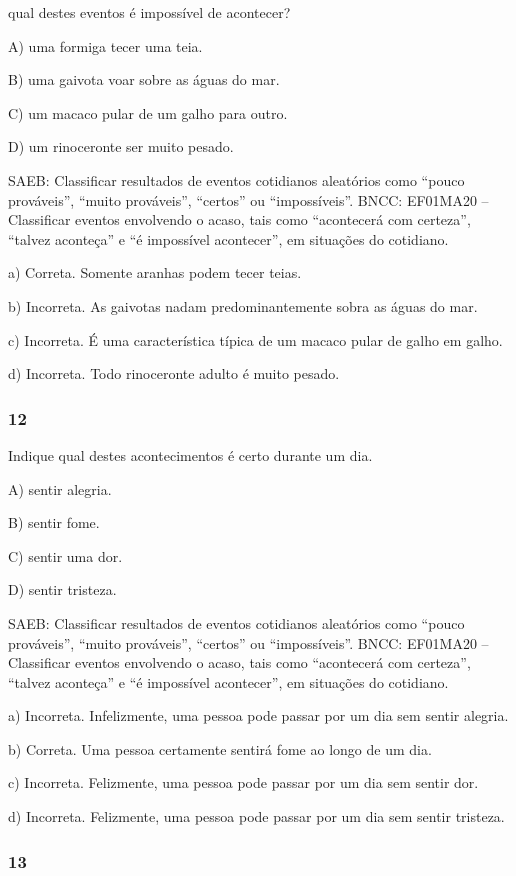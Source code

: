 qual destes eventos é impossível de acontecer?

A) uma formiga tecer uma teia.

B) uma gaivota voar sobre as águas do mar.

C) um macaco pular de um galho para outro.

D) um rinoceronte ser muito pesado.

SAEB: Classificar resultados de eventos cotidianos aleatórios como
``pouco prováveis'', ``muito prováveis'', ``certos'' ou ``impossíveis''.
BNCC: EF01MA20 -- Classificar eventos envolvendo o acaso, tais como
``acontecerá com certeza'', ``talvez aconteça'' e ``é impossível
acontecer'', em situações do cotidiano.

a) Correta. Somente aranhas podem tecer teias.

b) Incorreta. As gaivotas nadam predominantemente sobra as águas do mar.

c) Incorreta. É uma característica típica de um macaco pular de galho em
galho.

d) Incorreta. Todo rinoceronte adulto é muito pesado.

\subsubsection{12}\label{section-98}

Indique qual destes acontecimentos é certo durante um dia.

A) sentir alegria.

B) sentir fome.

C) sentir uma dor.

D) sentir tristeza.

SAEB: Classificar resultados de eventos cotidianos aleatórios como
``pouco prováveis'', ``muito prováveis'', ``certos'' ou ``impossíveis''.
BNCC: EF01MA20 -- Classificar eventos envolvendo o acaso, tais como
``acontecerá com certeza'', ``talvez aconteça'' e ``é impossível
acontecer'', em situações do cotidiano.

a) Incorreta. Infelizmente, uma pessoa pode passar por um dia sem sentir alegria.

b) Correta. Uma pessoa certamente sentirá fome ao longo de um dia.

c) Incorreta. Felizmente, uma pessoa pode passar por um dia sem sentir dor.

d) Incorreta. Felizmente, uma pessoa pode passar por um dia sem sentir tristeza.

\subsubsection{13}\label{section-99}

